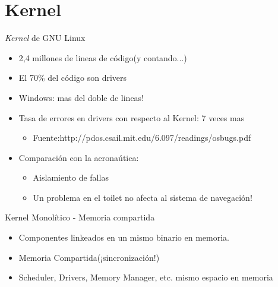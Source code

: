 \section{Kernel}

\begin{frame}{ \textit{Kernel} de GNU Linux}
 \begin{itemize}
  \item 2,4 millones de lineas de código(y contando...)
  \item El 70\% del código son drivers
  \item Windows: mas del doble de lineas!
  \item Tasa de errores en drivers con respecto al Kernel: 7 veces mas
  	\begin{itemize}
 	  \item Fuente:http://pdos.csail.mit.edu/6.097/readings/osbugs.pdf 
  	\end{itemize}
    \item Comparación con la aeronaútica: 
 	\begin{itemize}
   	\item Aislamiento de fallas
	\item Un problema en el toilet no afecta al sistema de navegación!  
  	\end{itemize}
 \end{itemize}	

\end{frame}


\begin{frame}{Kernel Monolítico - Memoria compartida}
  \begin{center}
   \end{center}
 \begin{itemize}
    \item Componentes linkeados en un mismo binario en memoria.
    \item Memoria Compartida(¡sincronización!) 
    \item Scheduler, Drivers, Memory Manager, etc. mismo espacio en memoria
   \end{itemize} 
\end{frame}


